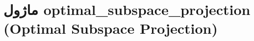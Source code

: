 \section{ماژول optimal\_subspace\_projection (Optimal Subspace Projection)}
\label{sec:module_optimal_subspace_projection}
